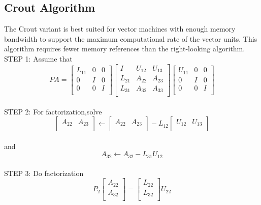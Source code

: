\subsection{Crout Algorithm}
The Crout variant is best suited for vector machines with enough memory bandwidth to support the maximum computational rate of the vector units. This algorithm
requires fewer memory references than the right-looking algorithm.\\
STEP 1: Assume that
\begin{equation}
PA=
\left[\begin{array}{lll}
L_{11} & 0 & 0\\
0 & I & 0\\
0 & 0 & I\\
\end{array}\right]    
\left[\begin{array}{lll}
I & U_{12} & U_{13}\\
L_{21} & A_{22} & A_{23}\\   
L_{31} & A_{32} & A_{33}\\
\end{array}\right]   
\left[\begin{array}{lll}
U_{11} & 0 & 0\\
0 & I & 0\\
0 & 0 & I\\
\end{array}\right]
\end{equation}\\
STEP 2: For factorization,solve
\begin{equation}
\left[\begin{array}{ll}
A_{22} & A_{23}\\  
\end{array}\right] \leftarrow
\left[\begin{array}{ll} 
A_{22} & A_{23}\\ 
\end{array}\right] - L_{12}
\left[\begin{array}{ll} 
U_{12} & U_{13}\\ 
\end{array}\right] 
\end{equation}\\
and
\begin{equation}
A_{32} \leftarrow A_{32} - L_{31}U_{12}
\end{equation}\\
STEP 3: Do factorization 
\begin{equation}
P_{2}
\left[\begin{array}{l}
A_{22} \\
A_{32} \\
\end{array}\right] =
\left[\begin{array}{l}
L_{22} \\
L_{32}\\
\end{array}\right] U_{22}
\end{equation}\\
